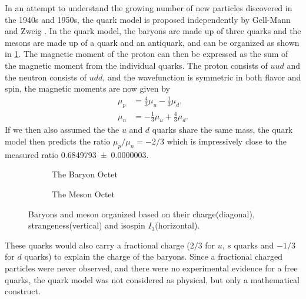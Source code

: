 \documentclass[../main.tex]{subfiles}
\begin{document}
In an attempt to understand the growing number of new particles discovered in the 1940s and 1950s,
the quark model is proposed independently by Gell-Mann \cite{gell-mann1964} and Zweig  \cite{zweig1964a, zweig1964}.
In the quark model, the baryons are made up of three quarks and the mesons are made up
of a quark and an antiquark, and can be organized as shown in \cref{fig:Octet}.
The magnetic moment of the proton can then be expressed as the sum of the magnetic moment
from the individual quarks. The proton consists of $uud$ and the neutron consists of $udd$,
and the wavefunction is symmetric in both flavor and spin, the magnetic moments are now given by
\begin{align}
	\mu_p & = \frac{4}{3}\mu_u-\frac{1}{3}\mu_d,  \\
	\mu_n & = -\frac{1}{3}\mu_u+\frac{4}{3}\mu_d.
\end{align}
If we then also assumed the the $u$ and $d$ quarks share the same mass, the quark model
then predicts the ratio $\mu_p/\mu_n=-2/3$ which is impressively close to the measured ratio
\num{0.6849793(3)}\cite{workman2022}.
\begin{figure}[h!]
	\centering
	\begin{subfigure}{0.45\linewidth}
		
		\caption{The Baryon Octet}
	\end{subfigure}
	\begin{subfigure}{0.45\linewidth}
		
		\caption{The Meson Octet}
	\end{subfigure}
	\caption{Baryons and meson organized based on their charge(diagonal), strangeness(vertical) and isospin $I_3$(horizontal). }
	\label{fig:Octet}
\end{figure}
These quarks would also carry a fractional charge ($2/3$ for $u$, $s$ quarks and $-1/3$ for $d$ quarks) to
explain the charge of the baryons. Since a fractional charged particles were never observed, and there were
no experimental evidence for a free quarks, the quark model was not considered as physical, but only a mathematical construct.
\end{document}
